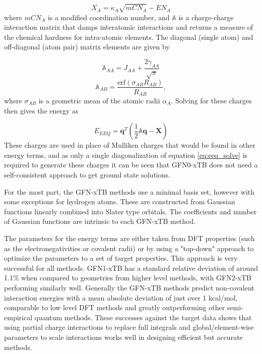 \begin{equation}
    X_A = \kappa_A \sqrt{mCN_A} - EN_A
\end{equation}
%
where $mCN_A$ is a modified coordination number, and $\mathbb{A}$ is a charge-charge
interaction matrix that damps interatomic interactions and returns a measure of 
the chemical hardness for intra-atomic elements. The diagonal (single atom) and 
off-diagonal (atom pair) matrix elements are given by

\begin{equation}
    \mathbb{A}_{AA} = J_{AA} + \frac{2\gamma_{AA}}{\sqrt{\pi}}
\end{equation}
%
\begin{equation}
    \mathbb{A}_{AB} = \frac{\text{erf}\left(\sigma_{AB} R_{AB}\right)}{R_{AB}},
\end{equation}
%
where $\sigma_{AB}$ is a geometric mean of the atomic radii $\alpha_A$. Solving 
for these charges then gives the energy as 

\begin{equation}
    E_{EEQ} = \mathbf{q}^T \left(\frac{1}{2}\mathbb{A}\mathbf{q} - \mathbf{X}\right)
\end{equation}
%
These charges are used in place of Mulliken charges that would be found in other
energy terms, and as only a single diagonalization of equation \ref{eq:eeq_solve} 
is required to generate these charges it can be seen that GFN0-xTB does not need
a self-consistent approach to get ground state solutions.

For the most part, the GFN-xTB methods use a minimal basis set, however with some
exceptions for hydrogen atoms. These are constructed from Gaussian functions linearly
combined into Slater type orbitals. The coefficients and number of Gaussian functions
are intrinsic to each GFN-xTB method.

The parameters for the energy terms are either taken from DFT properties (such
as the electronegativities or covalent radii) or by using a "top-down" approach
to optimize the parameters to a set of target properties. This approach is very 
successful for all methods. GFN1-xTB  has a standard relative deviation of around
1.1\% when compared to geometries from higher level methods, with GFN2-xTB performing
similarly well. Generally the GFN-xTB methods predict non-covalent interaction energies
with a mean absolute deviation of just over 1 kcal/mol, comparable to low level 
DFT methods and greatly outperforming other semi-empirical quantum methods. These
successes against the target data shows that using partial charge interactions to
replace full integrals and global/element-wise parameters to scale interactions 
works well in designing efficient but accurate methods.

